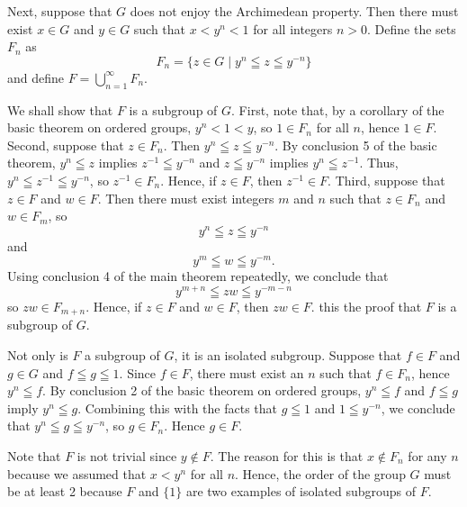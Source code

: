 \documentclass[12pt]{article}
\begin{document}
Next, suppose that $G$ does not enjoy the Archimedean property.  Then there must exist $x \in G$ and $y \in G$ such that $x < y^n < 1$ for all integers $n > 0$.  Define the sets $F_n$ as
 $$F_n = \{ z \in G \mid y^n \leqq z \leqq y^{-n} \}$$
and define $F = \bigcup_{n=1}^\infty F_n$.

We shall show that $F$ is a subgroup of $G$.  First, note that, by a corollary of the basic theorem on ordered groups, $y^n < 1 < y$, so $1 \in F_n$ for all $n$, hence $1 \in F$.  Second, suppose that $z \in F_n$.  Then $y^n \leqq z \leqq y^{-n}$.  By conclusion 5 of the basic theorem, $y^n \leqq z$ implies $z^{-1} \leqq y^{-n}$ and $z \leqq y^{-n}$ implies $y^n \leqq z^{-1}$.  Thus, $y^n \leqq z^{-1} \leqq y^{-n}$, so $z^{-1} \in F_n$.  Hence, if $z \in F$, then $z^{-1} \in F$.  Third, suppose that $z \in F$ and $w \in F$.  Then there must exist integers $m$ and $n$ such that $z \in F_n$ and $w \in F_m$, so
 $$y^n \leqq z \leqq y^{-n}$$
and
 $$y^m \leqq w \leqq y^{-m}.$$
Using conclusion 4 of the main theorem repeatedly, we conclude that
 $$y^{m+n} \leqq z w \leqq y^{-m-n}$$
so $z w \in F_{m+n}$.  Hence, if $z \in F$ and $w \in F$, then $zw \in F$.  this  the proof that $F$ is a subgroup of $G$.

Not only is $F$ a subgroup of $G$, it is an isolated subgroup.  Suppose that $f \in F$ and $g \in G$ and $f \leqq g \leqq 1$.  Since $f \in F$, there must exist an $n$ such that $f \in F_n$, hence $y^n \leqq f$.  By conclusion 2 of the basic theorem on ordered groups, $y^n \leqq f$ and $f \leqq g$ imply $y^n \leqq g$.  Combining this with the facts that $g \leqq 1$ and $1 \leqq y^{-n}$, we conclude that $y^n \leqq g \leqq y^{-n}$, so $g \in F_n$.  Hence $g \in F$.

Note that $F$ is not trivial since $y \notin F$.  The reason for this is that $x \notin F_n$ for any $n$ because we assumed that $x < y^n$ for all $n$.  Hence, the order of the group $G$ must be at least 2 because $F$ and $\{ 1 \}$ are two examples of isolated subgroups of $F$.
\end{document}
